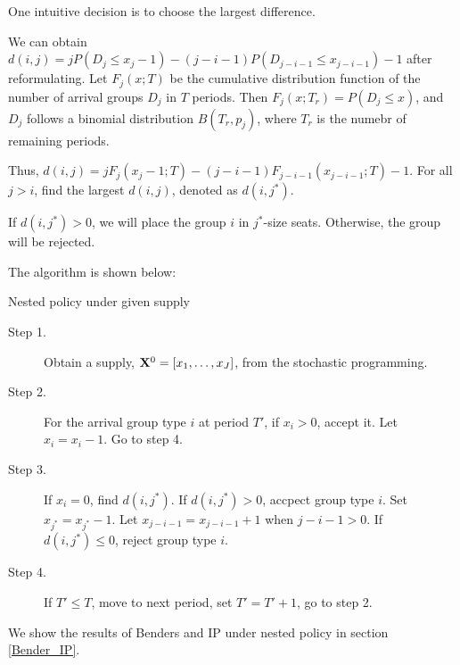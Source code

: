 One intuitive decision is to choose the largest difference.

We can obtain $d(i,j) = j P(D_{j} \leq x_{j} -1) - (j-i-1)P(D_{j-i-1} \leq x_{j-i-1}) -1$ after reformulating. 
Let $F_{j}(x;T)$ be the cumulative distribution function of the number of arrival groups $D_{j}$ in $T$ periods. Then $F_{j}(x; T_{r}) = P(D_{j} \leq x)$, and $D_{j}$ follows a binomial distribution $B(T_{r}, p_{j})$, where $T_{r}$ is the numebr of remaining periods.

Thus, $d(i,j) = j F_{j}(x_{j}-1; T) - (j-i-1) F_{j-i-1}(x_{j-i-1}; T) -1$. For all $j >i$, find the largest $d(i,j)$, denoted as $d(i,j^{*})$.

If $d(i,j^{*}) >0$, we will place the group $i$ in $j^{*}$-size seats. Otherwise, the group will be rejected.

The algorithm is shown below:

\begin{algorithm}[H]
  \caption{Nested policy under given supply}\label{algo_nested_policy}
  \begin{description}
    \item[Step 1.] Obtain a supply, $\mathbf{X}^{0} = [x_1,\ldots,x_{J}]$, from the stochastic programming.
    \item[Step 2.] For the arrival group type $i$ at period $T{'}$, if $x_{i} > 0$, accept it. Let $x_{i} = x_{i} -1$. Go to step 4.
    \item[Step 3.] If $x_{i} = 0$, find $d(i,j^{*})$. If $d(i,j^{*})>0$, accpect group type $i$. Set $x_{j^{*}} = x_{j^{*}} -1$. Let $x_{j-i-1} = x_{j-i-1} + 1$ when $j-i-1>0$. If $d(i,j^{*}) \leq 0$, reject group type $i$.
    \item[Step 4.] If $T{'} \leq T$, move to next period, set $T{'} = T{'}+1$, go to step 2.
  \end{description}
\end{algorithm}



We show the results of Benders and IP under nested policy in section \ref{Bender_IP}.



